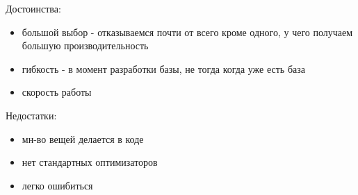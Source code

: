 Достоинства:
\begin{itemize}
	\item большой выбор - отказываемся почти от всего кроме одного, у чего получаем большую производительность
	\item гибкость - в момент разработки базы, не тогда когда уже есть база
	\item скорость работы
\end{itemize}

Недостатки:
\begin{itemize}
	\item мн-во вещей делается в коде
	\item нет стандартных оптимизаторов
	\item легко ошибиться
\end{itemize}

